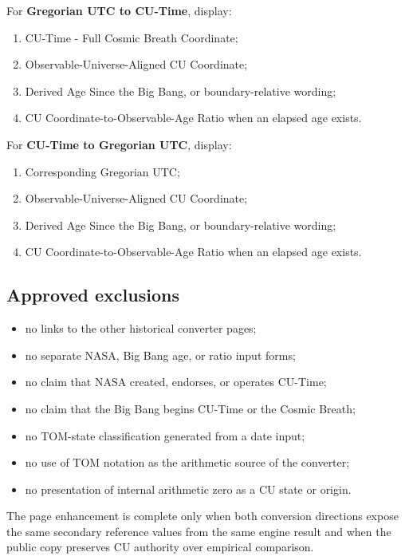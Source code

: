 \documentclass[11pt,letterpaper]{article}
\newcommand{\term}[1]{\textbf{\textsf{#1}}}
\begin{document}
For \term{Gregorian UTC to CU-Time}, display:
\begin{enumerate}
    \item CU-Time - Full Cosmic Breath Coordinate;
    \item Observable-Universe-Aligned CU Coordinate;
    \item Derived Age Since the Big Bang, or boundary-relative wording;
    \item CU Coordinate-to-Observable-Age Ratio when an elapsed age exists.
\end{enumerate}

For \term{CU-Time to Gregorian UTC}, display:
\begin{enumerate}
    \item Corresponding Gregorian UTC;
    \item Observable-Universe-Aligned CU Coordinate;
    \item Derived Age Since the Big Bang, or boundary-relative wording;
    \item CU Coordinate-to-Observable-Age Ratio when an elapsed age exists.
\end{enumerate}

\subsection*{Approved exclusions}

\begin{itemize}
    \item no links to the other historical converter pages;
    \item no separate NASA, Big Bang age, or ratio input forms;
    \item no claim that NASA created, endorses, or operates CU-Time;
    \item no claim that the Big Bang begins CU-Time or the Cosmic Breath;
    \item no TOM-state classification generated from a date input;
    \item no use of TOM notation as the arithmetic source of the converter;
    \item no presentation of internal arithmetic zero as a CU state or origin.
\end{itemize}

\begin{checkpointbox}
The page enhancement is complete only when both conversion directions expose
the same secondary reference values from the same engine result and when the
public copy preserves CU authority over empirical comparison.
\end{checkpointbox}
\end{document}
